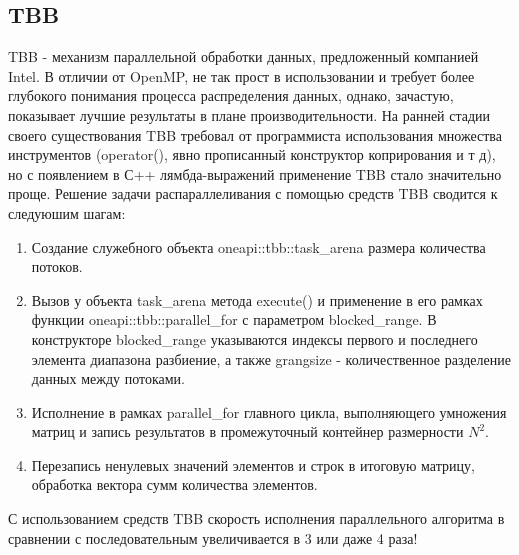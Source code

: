 \documentclass[12pt]{article}
\begin{document}
\subsection*{TBB}
TBB - механизм параллельной обработки данных, предложенный компанией Intel. В отличии от OpenMP, не так прост в использовании и требует более глубокого понимания процесса распределения данных, однако, зачастую, показывает лучшие результаты в плане производительности. На ранней стадии своего существования TBB требовал от программиста использования множества инструментов (operator(), явно прописанный конструктор коприрования и т д), но с появлением в С++ лямбда-выражений применение TBB стало значительно проще. Решение задачи распараллеливания с помощью средств TBB сводится к следуюшим шагам:
\begin{enumerate}
    \item Создание служебного объекта oneapi::tbb::task\_arena размера количества потоков.
    \item Вызов у объекта task\_arena метода execute() и применение в его рамках функции oneapi::tbb::parallel\_for с параметром 
    blocked\_range. В конструкторе blocked\_range указываются индексы первого и последнего элемента диапазона разбиение, а также grangsize - количественное разделение данных между потоками.
    \item Исполнение в рамках parallel\_for главного цикла, выполняющего умножения матриц и запись результатов в промежуточный контейнер размерности $N^2$. 
    \item Перезапись ненулевых значений элементов и строк в итоговую матрицу, обработка вектора сумм количества элементов.
\end{enumerate}
С использованием средств TBB скорость исполнения параллельного алгоритма в сравнении с последовательным увеличивается в 3 или даже 4 раза! \newpage
\end{document}
